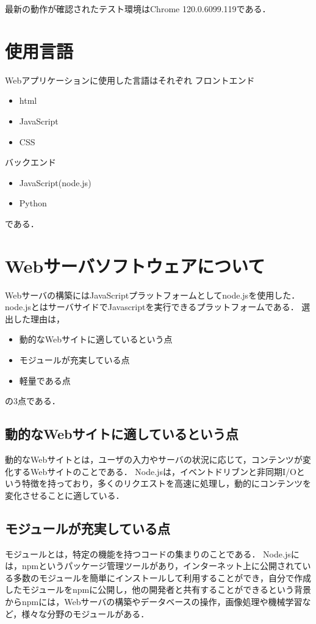 最新の動作が確認されたテスト環境はChrome 120.0.6099.119である．



\section{使用言語}
Webアプリケーションに使用した言語はそれぞれ
フロントエンド
\begin{itemize}
	\item html
	\item JavaScript
	\item CSS
\end{itemize}
バックエンド
\begin{itemize}
	\item JavaScript(node.js)
	\item Python
\end{itemize}
である．



\section{Webサーバソフトウェアについて}
Webサーバの構築にはJavaScriptプラットフォームとしてnode.jsを使用した．
node.jsとはサーバサイドでJavascriptを実行できるプラットフォームである．
選出した理由は，
\begin{itemize}
	\item 動的なWebサイトに適しているという点
	\item モジュールが充実している点
	\item 軽量である点
\end{itemize}
の3点である．

\subsection{動的なWebサイトに適しているという点}

動的なWebサイトとは，ユーザの入力やサーバの状況に応じて，コンテンツが変化するWebサイトのことである．
Node.jsは，イベントドリブンと非同期I/Oという特徴を持っており，多くのリクエストを高速に処理し，動的にコンテンツを変化させることに適している．

\subsection{モジュールが充実している点}

モジュールとは，特定の機能を持つコードの集まりのことである．
Node.jsには，npmというパッケージ管理ツールがあり，インターネット上に公開されている多数のモジュールを簡単にインストールして利用することができ，自分で作成したモジュールをnpmに公開し，他の開発者と共有することができるという背景からnpmには，Webサーバの構築やデータベースの操作，画像処理や機械学習など，様々な分野のモジュールがある．

